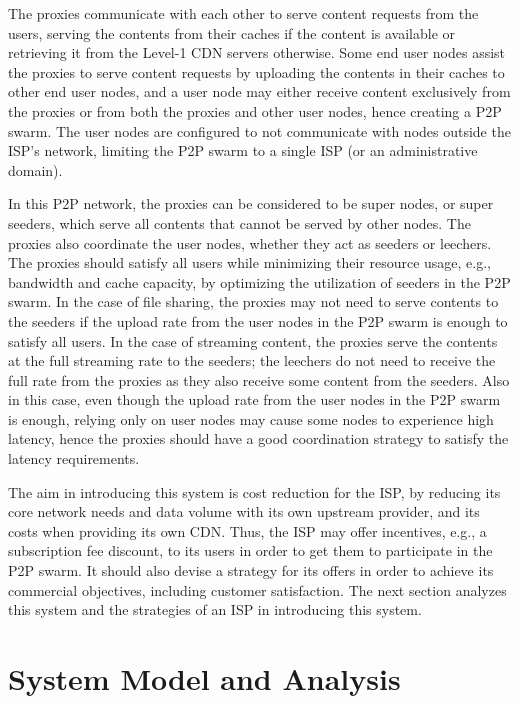 \documentclass[paper]{ieice}
\begin{document}
The proxies communicate with each other to serve content requests from the users, serving the contents from their caches if the content is available 
or retrieving it from the Level-1 CDN servers otherwise.
Some end user nodes assist the proxies to serve content requests by
uploading the contents in their caches to other end user nodes, and a
user node may either receive content exclusively from the proxies or
from both the proxies and other user nodes, hence creating a P2P swarm.
The user nodes are configured to not communicate with nodes outside
the ISP's network, limiting the P2P swarm to a single ISP (or an administrative domain).

In this P2P network, the proxies can be considered to be super nodes,
or super seeders, which serve all contents that cannot be served by
other nodes.  The proxies also coordinate the user nodes, whether they
act as seeders or leechers.  The proxies should satisfy all users
while minimizing their resource usage, e.g., bandwidth and cache
capacity, by optimizing the utilization of seeders in the P2P swarm.
In the case of file sharing, the proxies may not need to serve
contents to the seeders if the upload rate from the user nodes in the
P2P swarm is enough to satisfy all users.  In the case of streaming
content, the proxies serve the contents at the full streaming rate to
the seeders; the leechers do not need to receive the full rate from
the proxies as they also receive some content from the seeders.  Also
in this case, even though the upload rate from the user nodes in the
P2P swarm is enough, relying only on user nodes may cause some nodes
to experience high latency, hence the proxies should have a good
coordination strategy to satisfy the latency requirements.

The aim in introducing this system is cost reduction for the ISP, by
reducing its core network needs and data volume with its own upstream
provider, and its costs when providing its own CDN.  Thus, the ISP may
offer incentives, e.g., a subscription fee discount, to its users in
order to get them to participate in the P2P swarm.  It should also
devise a strategy for its offers in order to achieve its commercial
objectives, including customer satisfaction.  The next section
analyzes this system and the strategies of an ISP in introducing this
system.


  
 
\section{System Model and Analysis}\label{systemmodel}
\end{document}
